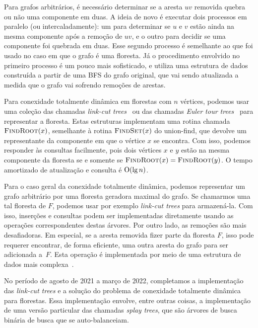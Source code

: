 Para grafos arbitrários, é necessário determinar se a aresta $uv$ removida quebra ou não uma 
componente em duas.  A ideia de novo é executar dois processos em paralelo (ou intercaladamente): 
um para determinar se $u$ e $v$ estão ainda na mesma componente após a remoção de $uv$, e o
outro para decidir se uma componente foi quebrada em duas.  Esse segundo processo é semelhante
ao que foi usado no caso em que o grafo é uma floresta.  Já o procedimento envolvido no 
primeiro processo é um pouco mais sofisticado, e utiliza uma estrutura de dados construída 
a partir de uma BFS do grafo original, que vai sendo atualizada a medida que o grafo vai 
sofrendo remoções de arestas. 

\newcommand{\FindRoot}{\mbox{\sc FindRoot}}
\newcommand{\FindSet}{\mbox{\sc FindSet}}

Para conexidade totalmente dinâmica em florestas com $n$ vértices, 
podemos usar uma coleção das chamadas \emph{link-cut trees}~\cite{SleatorT1983} ou 
das chamadas \emph{Euler tour trees}~\cite{HenzingerK1995} para representar a floresta.  
Estas estruturas implementam uma rotina chamada $\FindRoot(x)$, 
semelhante à rotina $\FindSet(x)$ do union-find, que devolve 
um representante da componente em que o vértice $x$ se encontra. 
Com isso, podemos responder às consultas facilmente, pois dois vértices $x$ e $y$ 
estão na mesma componente da floresta se e somente se $\FindRoot(x) = \FindRoot(y)$.
O tempo amortizado de atualização e consulta é $\mathrm{O}(\lg n)$.

Para o caso geral da conexidade totalmente dinâmica, podemos representar um grafo arbitrário  
por uma floresta geradora maximal do grafo.  Se chamarmos uma tal floresta de $F$, podemos 
usar por exemplo \emph{link-cut trees} para armazená-la.  Com isso, inserções e consultas 
podem ser implementadas diretamente usando as operações correspondentes destas árvores.  
Por outro lado, as remoções são mais desafiadoras.  Em especial, se a aresta removida fizer
parte da floresta $F$, isso pode requerer encontrar, de forma eficiente, uma outra aresta 
do grafo para ser adicionada a~$F$. Esta operação é implementada por meio de uma estrutura
de dados mais complexa~\cite{DemaineL2007}. 

No período de agosto de 2021 a março de 2022, completamos a implementação das \emph{link-cut trees} 
e a solução do problema de conexidade totalmente dinâmica para florestas.
Essa implementação envolve, entre outras coisas, a implementação de uma versão particular das chamadas \emph{splay trees}, 
que são árvores de busca binária de busca que se auto-balanceiam.

